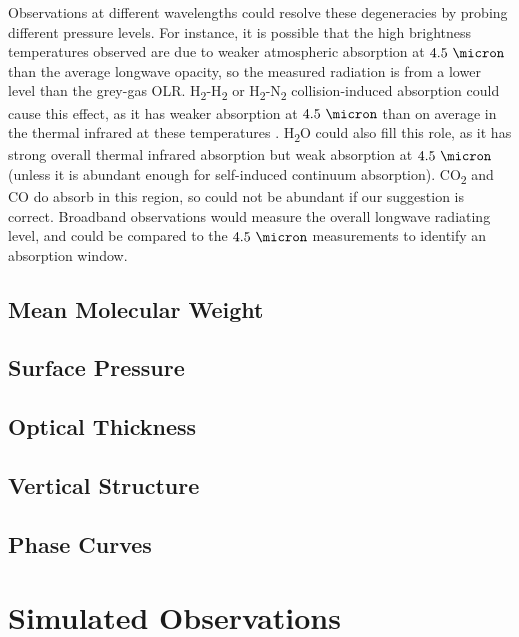 Observations at different wavelengths could resolve these degeneracies by  probing different pressure levels. For instance, it is possible that the high brightness temperatures observed are due to weaker atmospheric absorption at $4.5\ \micron$ than the average longwave opacity, so the measured radiation is from a lower level than the grey-gas OLR. H\textsubscript{2}-H\textsubscript{2} or H\textsubscript{2}-N\textsubscript{2} collision-induced absorption could cause this effect, as it has weaker absorption at $4.5\ \micron$ than on average in the thermal infrared at these temperatures \citep{wordsworth2013hydrogen}. H\textsubscript{2}O could also fill this role, as it has strong overall thermal infrared absorption but weak absorption at $4.5\ \micron$ (unless it is abundant enough for self-induced continuum absorption). CO\textsubscript{2} and CO do absorb in this region, so could not be abundant if our suggestion is correct. Broadband observations would measure the overall longwave radiating level, and could be compared to the $4.5\ \micron$ measurements to identify an absorption window.



\subsection{Mean Molecular Weight}

\subsection{Surface Pressure}

\subsection{Optical Thickness}

\subsection{Vertical Structure}

\subsection{Phase Curves}


\section{Simulated Observations}

